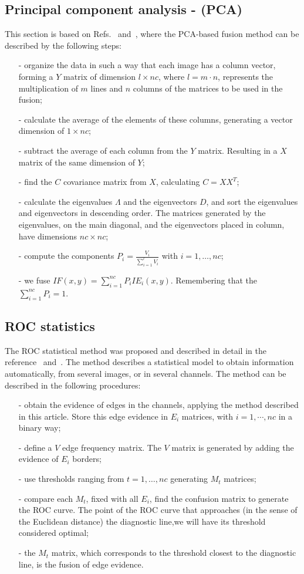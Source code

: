 \documentclass[conference]{IEEEtran}
\begin{document}
\subsection{Principal component analysis - (PCA) }
This section is based on Refs.~\cite{n_r} and~\cite{mit}, where the PCA-based fusion method can be described by the following steps:
\begin{itemize}
\item[-] organize the data in such a way that each image has a column vector, forming a $Y$ matrix of dimension $l\times nc$, where $l=m\cdot n$, represents the multiplication of $m$ lines and $n$ columns of the matrices to be used in the fusion;
\item[-] calculate the average of the elements of these columns, generating a vector dimension of $1\times nc$;
\item[-] subtract the average of each column from the $Y$ matrix. Resulting in a $X$ matrix of the same dimension of $Y$; 
\item[-] find the $C$ covariance matrix from $X$, calculating $C=XX^T$;
\item[-] calculate the eigenvalues $\Lambda$ and the eigenvectors $D$, and sort the eigenvalues and eigenvectors in descending order. The matrices generated by the eigenvalues, on the main diagonal, and the eigenvectors placed in column, have dimensions $nc\times nc$;
\item[-] compute the components $P_i=\frac{V_i}{\sum_{i=1}^l V_i}$ with $i=1,\dots,nc$;
\item[-] we fuse $IF(x,y)=\sum_{i=1}^{nc}P_iIE_i(x,y)$. Remembering that the $\sum_{i=1}^{nc}P_i=1$.
\end{itemize}

\subsection{ROC statistics}
The ROC statistical method was proposed and described in detail in the reference~\cite{gs} and~\cite{fawcett}. The method describes a statistical model to obtain information automatically, from several images, or in several channels. The method can be described in the following procedures:
\begin{itemize}
\item[-] obtain the evidence of edges in the channels, applying the method described in this article. Store this edge evidence in $E_i$ matrices, with $i=1,\cdots,nc$ in a binary way;
\item[-] define a $V$ edge frequency matrix. The $V$ matrix is generated by adding the evidence of $E_i$ borders;
\item[-] use thresholds ranging from $t=1,\dots,nc$ generating $M_t$ matrices;
\item[-] compare each $M_t$, fixed with all $E_i$, find the confusion matrix to generate the ROC curve. The point of the ROC curve that approaches (in the sense of the Euclidean distance) the diagnostic line,we will have its threshold considered optimal;
\item[-] the $M_t$ matrix, which corresponds to the threshold closest to the diagnostic line, is the fusion of edge evidence.
\end{itemize}
\end{document}
